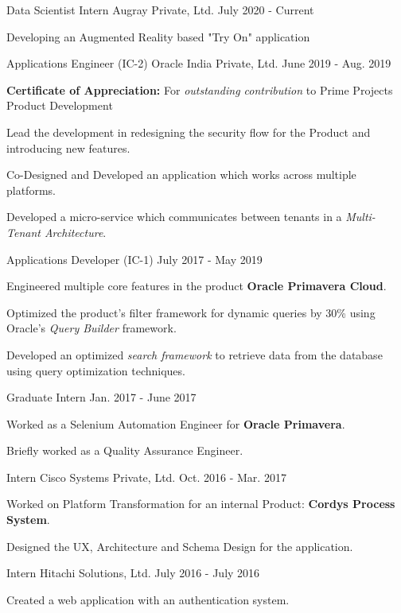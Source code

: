 \begin{cventries}
  \cventry
    {Data Scientist Intern}
    {Augray Private, Ltd.}
    {}
    {July 2020 - Current}
    {
      \begin{cvitems}
        \item {Developing an Augmented Reality based "Try On" application}
      \end{cvitems}
    }
  \cventry
    {Applications Engineer (IC-2)}
    {Oracle India Private, Ltd.}
    {}
    {June 2019 - Aug. 2019}
    {
      \begin{cvitems}
        \item {\textbf{Certificate of Appreciation:} For \textit{outstanding contribution} to Prime Projects Product Development}
        \item {Lead the development in redesigning the security flow for the Product and introducing new features.}
        \item {Co-Designed and Developed an application which works across multiple platforms.}
        \item {Developed a micro-service which communicates between tenants in a \textit{Multi-Tenant Architecture}.}
      \end{cvitems}
    }
  \cventrypart
    {Applications Developer (IC-1)}
    {}
    {July 2017 - May 2019}
    {
      \begin{cvitems}
        \item {Engineered multiple core features in the product \textbf{Oracle Primavera Cloud}.}
        \item {Optimized the product's filter framework for dynamic queries by 30\% using Oracle's \textit{Query Builder} framework.}
        \item {Developed an optimized \textit{search framework} to retrieve data from the database using query optimization techniques.}
      \end{cvitems}
    }
  \cventrypart
    {Graduate Intern}
    {}
    {Jan. 2017 - June 2017}
    {
      \begin{cvitems}
        \item {Worked as a Selenium Automation Engineer for \textbf{Oracle Primavera}.}
        \item {Briefly worked as a Quality Assurance Engineer.}
      \end{cvitems}
    }
  \cventry
    {Intern}
    {Cisco Systems Private, Ltd.}
    {}
    {Oct. 2016 - Mar. 2017}
    {
      \begin{cvitems}
        \item {Worked on Platform Transformation for an internal Product: \textbf{Cordys Process System}.}
        \item {Designed the UX, Architecture and Schema Design for the application.}
      \end{cvitems} 
    }
  \cventry
    {Intern}
    {Hitachi Solutions, Ltd.}
    {}
    {July 2016 - July 2016}
    {
      \begin{cvitems}
        \item {Created a web application with an authentication system.}    
      \end{cvitems}
    }
\end{cventries}